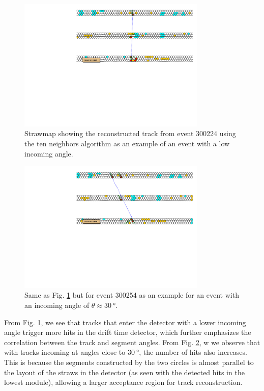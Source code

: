 \documentclass[a4paper]{report}
\numberwithin{equation}{section}
\begin{document}
\begin{figure}[!h]
	\centering
	\includegraphics[width=0.8\textwidth]{event300224.pdf}
	\caption{Strawmap showing the reconstructed track from event 300224 using the ten neighbors algorithm as 
	an example of an event with a low incoming angle. }
	\label{fig:strawmap_300224}
\end{figure}

\begin{figure}[!h]
	\centering
	\includegraphics[width=0.8\textwidth]{event300254.pdf}
	\caption{Same as Fig. \ref{fig:strawmap_300224} but for event 300254 as an example for an event with an incoming angle of 
	$\theta \approx \SI{30}{\degree}$. }
	\label{fig:strawmap_300254}
\end{figure}

From Fig. \ref{fig:strawmap_300224}, we see that tracks that enter the detector with a lower incoming angle trigger more hits in the 
drift time detector, which further emphasizes the correlation between the track and segment angles. From Fig. \ref{fig:strawmap_300254}, w
we observe that with tracks incoming at angles close to $\SI{30}{\degree}$, the number of hits also increases. This is because 
the segments constructed by the two circles is almost parallel to the layout of the straws in the detector (as seen with the detected hits 
in the lowest module), allowing a larger acceptance region for track reconstruction. 
\end{document}
